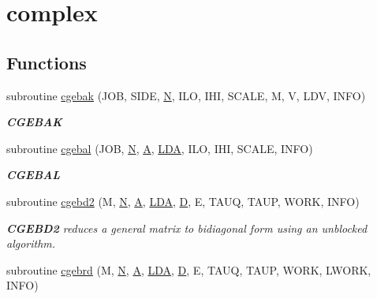 \hypertarget{group__complexGEcomputational}{}\section{complex}
\label{group__complexGEcomputational}
\subsection*{Functions}
\begin{DoxyCompactItemize}
\item 
subroutine \hyperlink{group__complexGEcomputational_ga7b18618f418e36eb2d8cfa0cae8fed3b}{cgebak} (J\+O\+B, S\+I\+D\+E, \hyperlink{polmisc_8c_a0240ac851181b84ac374872dc5434ee4}{N}, I\+L\+O, I\+H\+I, S\+C\+A\+L\+E, M, V, L\+D\+V, I\+N\+F\+O)
\begin{DoxyCompactList}\small\item\em {\bfseries C\+G\+E\+B\+A\+K} \end{DoxyCompactList}\item 
subroutine \hyperlink{group__complexGEcomputational_ga5298bb6589a104e31eb5d832f2d9d498}{cgebal} (J\+O\+B, \hyperlink{polmisc_8c_a0240ac851181b84ac374872dc5434ee4}{N}, \hyperlink{classA}{A}, \hyperlink{example__user_8c_ae946da542ce0db94dced19b2ecefd1aa}{L\+D\+A}, I\+L\+O, I\+H\+I, S\+C\+A\+L\+E, I\+N\+F\+O)
\begin{DoxyCompactList}\small\item\em {\bfseries C\+G\+E\+B\+A\+L} \end{DoxyCompactList}\item 
subroutine \hyperlink{group__complexGEcomputational_ga3066386c9875ffe61cb0f8299012360a}{cgebd2} (M, \hyperlink{polmisc_8c_a0240ac851181b84ac374872dc5434ee4}{N}, \hyperlink{classA}{A}, \hyperlink{example__user_8c_ae946da542ce0db94dced19b2ecefd1aa}{L\+D\+A}, \hyperlink{odrpack_8h_a7dae6ea403d00f3687f24a874e67d139}{D}, E, T\+A\+U\+Q, T\+A\+U\+P, W\+O\+R\+K, I\+N\+F\+O)
\begin{DoxyCompactList}\small\item\em {\bfseries C\+G\+E\+B\+D2} reduces a general matrix to bidiagonal form using an unblocked algorithm. \end{DoxyCompactList}\item 
subroutine \hyperlink{group__complexGEcomputational_ga9f4ec4d67a5ab8355936f6252defa8f5}{cgebrd} (M, \hyperlink{polmisc_8c_a0240ac851181b84ac374872dc5434ee4}{N}, \hyperlink{classA}{A}, \hyperlink{example__user_8c_ae946da542ce0db94dced19b2ecefd1aa}{L\+D\+A}, \hyperlink{odrpack_8h_a7dae6ea403d00f3687f24a874e67d139}{D}, E, T\+A\+U\+Q, T\+A\+U\+P, W\+O\+R\+K, L\+W\+O\+R\+K, I\+N\+F\+O)

\end{DoxyCompactItemize}
